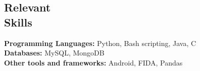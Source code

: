 \documentclass[margin,line]{resume}
\newif\ifReferences
\begin{document}
\begin{resume}
\filbreak
\section{\mysidestyle Relevant\\Skills} 
\textbf{Programming Languages:} Python, Bash scripting, Java, C\vspace{2mm}\\
\textbf{Databases:} MySQL, MongoDB\vspace{2mm}\\
\textbf{Other tools and frameworks:} Android, FIDA, Pandas 



 


%
\end{resume}
\end{document}
